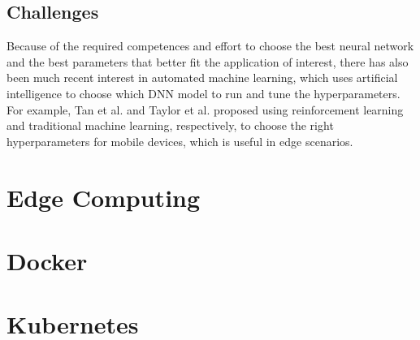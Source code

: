 \subsection{Challenges}
Because of the required competences and effort to choose the best neural network and the best parameters that better fit the application of interest, there has also been much recent interest in automated machine learning, which uses artificial intelligence to choose which DNN model to run and tune the hyperparameters. 
For example, Tan et al. \cite{tan2018mnasnet} and Taylor et al. \cite{taylor2018adaptive} proposed using reinforcement learning and traditional machine learning, respectively, to choose the right hyperparameters for mobile devices, which is useful in edge scenarios.


\section{Edge Computing}

\section{Docker}

\section{Kubernetes}


\clearpage
\thispagestyle{empty}